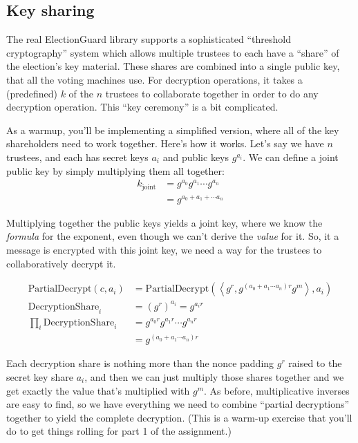 \subsection{Key sharing}
\label{sec:keyshare}

The real ElectionGuard library supports a sophisticated ``threshold
cryptography'' system
which allows multiple trustees to each have a ``share'' of the
election's key material. These shares are combined into a single
public key, that all the voting machines use. For decryption
operations, it takes a (predefined) $k$ of the $n$ trustees to
collaborate together in order to do any decryption operation.
This ``key ceremony'' is a bit complicated.

As a warmup, you'll be implementing a simplified version, where
all of the key shareholders need to work together. Here's how it
works. Let's say we have $n$ trustees, and each has secret keys $a_i$
and public keys $g^{a_i}$. We can define a joint public key by
simply multiplying them all together:
\begin{align*}
k_{\mathrm{joint}}&= g^{a_0}g^{a_1} \cdots g^{a_n}\\
&= g^{a_0 + a_1 + \cdots a_n}
\end{align*}
                                                                 
Multiplying together the public keys yields a joint key, where we know
the {\em formula} for the exponent, even though we can't derive the
{\em value} for it. So, it a message is encrypted with this joint key,
we need a way for the trustees to collaboratively decrypt it.

\begin{align*}
\mathrm{PartialDecrypt}(c, a_i) &= \mathrm{PartialDecrypt}\left(\left<g^r, g^{(a_0 + a_1 \cdots a_n)r}g^m\right>,a_i\right) \\
\mathrm{DecryptionShare}_i &= ({g^r})^{a_i} = g^{a_ir} \\
\prod_i \mathrm{DecryptionShare}_i &= g^{a_0r}g^{a_1r}\cdots g^{a_nr} \\
&= g^{(a_0 + a_1 \cdots a_n)r}
\end{align*}

Each decryption share is nothing more than the nonce padding $g^r$
raised to the secret key share $a_i$, and then we can just multiply
those shares together and we get exactly the value that's multiplied
with $g^m$. As before, multiplicative inverses are easy to find, so
we have everything we need to combine ``partial decryptions'' together
to yield the complete decryption. (This is a warm-up exercise that
you'll do to get things rolling for part 1 of the assignment.)


